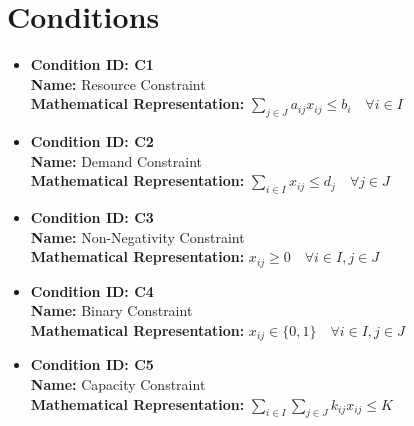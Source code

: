 \documentclass{article}
\begin{document}
\section{Conditions}
\begin{itemize}
    \item \textbf{Condition ID: C1} \\
    \textbf{Name:} Resource Constraint \\
    \textbf{Mathematical Representation:} $\sum_{j \in J} a_{ij}x_{ij} \leq b_i \quad \forall i \in I$

    \item \textbf{Condition ID: C2} \\
    \textbf{Name:} Demand Constraint \\
    \textbf{Mathematical Representation:} $\sum_{i \in I} x_{ij} \leq d_j \quad \forall j \in J$

    \item \textbf{Condition ID: C3} \\
    \textbf{Name:} Non-Negativity Constraint \\
    \textbf{Mathematical Representation:} $x_{ij} \geq 0 \quad \forall i \in I, j \in J$

    \item \textbf{Condition ID: C4} \\
    \textbf{Name:} Binary Constraint \\
    \textbf{Mathematical Representation:} $x_{ij} \in \{0, 1\} \quad \forall i \in I, j \in J$

    \item \textbf{Condition ID: C5} \\
    \textbf{Name:} Capacity Constraint \\
    \textbf{Mathematical Representation:} $\sum_{i \in I} \sum_{j \in J} k_{ij}x_{ij} \leq K$
\end{itemize}
\end{document}
